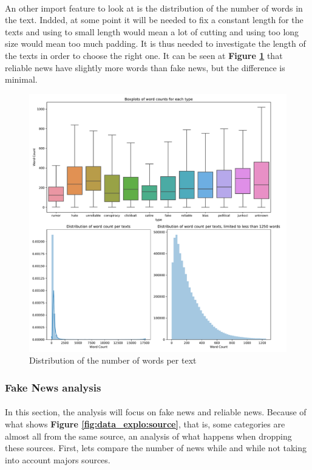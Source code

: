 \paragraph{} An other import feature to look at is the distribution of the number of words in the text. Indded, at some point it will be needed to fix a constant length for the texts and using to small length would mean a lot of cutting and using too long size would mean too much padding. It is thus needed to investigate the length of the texts in order to choose the right one. It can be seen at \textbf{Figure \ref{fig:data_explo:fake_corps_summary1}} that reliable news have slightly more words than fake news, but the difference is minimal. 

\begin{figure}[!ht]
  \centering
  \includegraphics[width=\textwidth]{images/data_exploration/fake_corpus_summary1.pdf}
  \caption{Distribution of the number of words per text}
  \label{fig:data_explo:fake_corps_summary1}
\end{figure}


\subsubsection{Fake News analysis}
\paragraph{} In this section, the analysis will focus on fake news and reliable news. Because of what shows \textbf{Figure \ref{fig:data_explo:source}}, that is, some categories are almost all from the same source, an analysis of what happens when dropping these sources. First, lets compare the number of news while and while not taking into account majors sources. 

